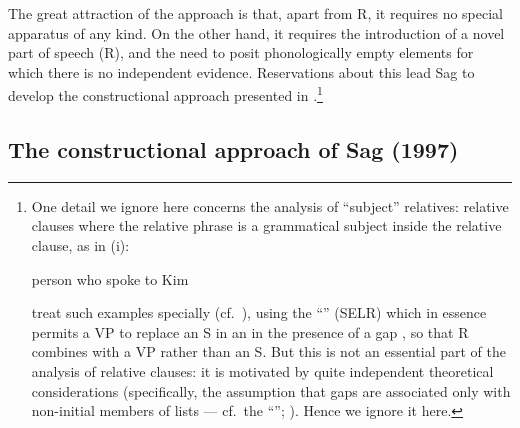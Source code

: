 \documentclass[output=paper
 	        ,biblatex
                ,babelshorthands
                ,newtxmath
                ,draftmode
                ,colorlinks, citecolor=brown
]{langscibook}
\begin{document}
The great attraction of the approach is that, apart from R, it requires no special
apparatus of any kind. On the other hand, it requires the introduction of a novel part
of speech (R), and the need to posit phonologically empty elements for which there is no
independent evidence. Reservations about this lead Sag to develop the constructional
approach presented in .\footnote{\label{fn:rc-1}%
One detail we ignore here concerns the analysis of ``subject'' relatives: relative clauses where
the relative phrase is a grammatical subject inside the relative clause, as in (i):
\begin{exe}
  \ex\label{x:rc-40} person who spoke to Kim 
\end{exe}
\citet{Pollard:Sag:94} treat such examples specially (cf.\
\citealt[218--219]{Pollard:Sag:94}), using the ``'' (SELR)
which in essence permits a VP to replace an S in an \feat{arg-st} in the presence of a
gap \citep[174]{Pollard:Sag:94}, so that R combines with a VP rather than an S. But this
is not an essential part of the analysis of relative clauses: it is motivated by quite
independent theoretical considerations (specifically, the assumption that gaps are
associated only with non-initial members of \feat{arg-st} lists --- cf.\ the
``\isi{Trace-Principle}''; \citealt[172]{Pollard:Sag:94}). Hence we ignore it here.}


\subsection{The constructional approach of Sag (1997)}
\label{sec:rc-sag-1997}
\end{document}
